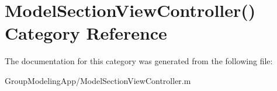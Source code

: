 \hypertarget{category_model_section_view_controller_07_08}{\section{Model\-Section\-View\-Controller() Category Reference}
\label{category_model_section_view_controller_07_08}
}


The documentation for this category was generated from the following file\-:\begin{DoxyCompactItemize}
\item 
Group\-Modeling\-App/Model\-Section\-View\-Controller.\-m\end{DoxyCompactItemize}
